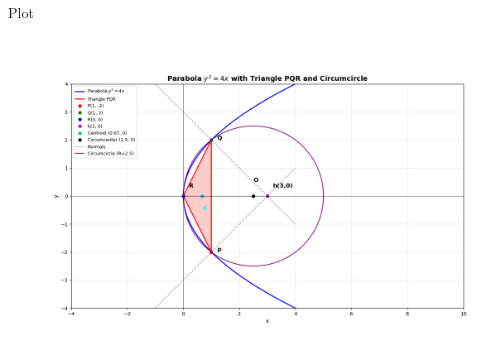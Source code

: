 \documentclass{beamer}
\begin{document}
\begin{frame}{Plot}
\begin{figure}[H]
	\centering
	\includegraphics[width=1.1\linewidth]{figs/Figure_1}
	\caption{}
	\label{fig:figure1}
\end{figure}

\end{frame}
\end{document}

